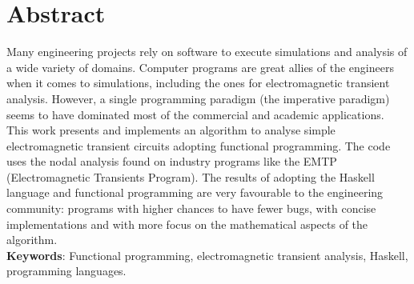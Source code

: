 \chapter*{Abstract}

Many engineering projects rely on software to execute simulations and analysis of a wide variety of domains. Computer programs are great allies of the engineers when it comes to simulations, including the ones for electromagnetic transient analysis. However, a single programming paradigm (the imperative paradigm) seems to have dominated most of the commercial and academic applications. 
\\

This work presents and implements an algorithm to analyse simple electromagnetic transient circuits adopting functional programming. The code uses the nodal analysis found on industry programs like the EMTP (Electromagnetic Transients Program). The results of adopting the Haskell language and functional programming are very favourable to the engineering community: programs with higher chances to have fewer bugs, with concise implementations and with more focus on the mathematical aspects of the algorithm.
\\

\textbf{Keywords}: Functional programming, electromagnetic transient analysis, Haskell, programming languages.
